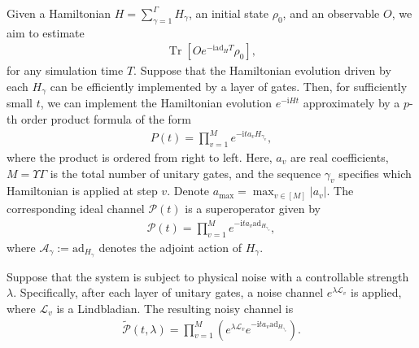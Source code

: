 \documentclass[aps,pra,reprint,groupedaddress,floatfix]{revtex4-2}
\renewcommand{\i}{\mathrm{i}}
\newcommand{\ad}{\mathrm{ad}}
\renewcommand{\P}{\mathcal{P}}
\newcommand{\A}{\mathcal{A}}
\newcommand{\mc}{\mathcal}
\newcommand{\xz}[1]{{\color{cyan} XZ: #1}}
\newcommand{\sz}[1]{{\color{blue} Shuo: #1}}
\begin{document}
Given a Hamiltonian $H = \sum_{\gamma=1}^{\Gamma} H_{\gamma}$, an initial state $\rho_0$, and an observable $O$, we aim to estimate \begin{align*}
    \operatorname{Tr}[Oe^{-\i \ad_H T} \rho_0],
\end{align*}
for any simulation time $T$.
Suppose that the Hamiltonian evolution driven by each $H_{\gamma}$ can be efficiently implemented by a layer of gates. Then, for sufficiently small $t$, we can implement the Hamiltonian evolution $e^{-\i H t}$ approximately by a $p$-th order product formula of the form
\begin{align*}
    P(t) = \prod_{v=1}^Me^{-\i t a_{v} H_{\gamma_v}},
\end{align*}
where the product is ordered from right to left. Here, $a_{v}$ are real coefficients, $M = \Upsilon\Gamma$ is the total number of unitary gates, and the sequence $\gamma_v$ specifies which Hamiltonian is applied at step $v$. Denote $a_{\max} = \max_{v\in [M]} |a_v|$. The corresponding ideal channel $\P(t)$ is a superoperator given by
\begin{align*}
    \P(t) = \prod_{v=1}^Me^{-\i t a_{v} \ad_{H_{\gamma_v}}},
\end{align*}
where $\A_{\gamma}:=\ad_{H_{\gamma}}$ denotes the adjoint action of $H_{\gamma}$. 

Suppose that the system is subject to physical noise with a controllable strength $\lambda$. Specifically, after each layer of unitary gates, a noise channel $e^{\lambda \mc L_{v}}$ is applied, where $\mc L_{v}$ is a Lindbladian. The resulting noisy channel is
\begin{align*}
    \tilde{\P}(t,\lambda)=\prod_{v=1}^M\left( e^{\lambda \mc L_{v}} e^{-\i t a_{v} \ad_{H_{\gamma_v}}} \right).
\end{align*} 
\end{document}
